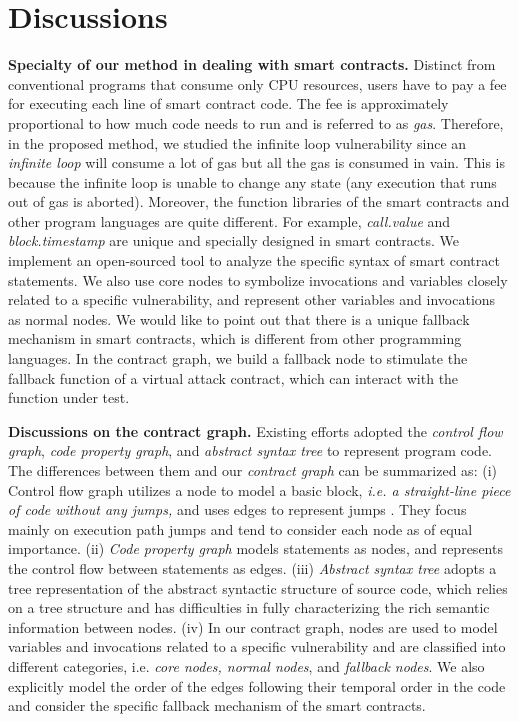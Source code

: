 \vspace{-0.7em}
\section{Discussions}
\textbf{Specialty of our method in dealing with smart contracts.} Distinct from conventional programs that consume only CPU resources, users have to pay a fee for executing each line of smart contract code. The fee is approximately proportional to how much code needs to run and is referred to as \emph{gas}. Therefore, in the proposed method, we studied the infinite loop vulnerability since an \emph{infinite loop} will consume a lot of gas but all the gas is consumed in vain. This is because the infinite loop is unable to change any state (any execution that runs out of gas is aborted).  Moreover, the function libraries of the smart contracts and other program languages are quite different. For example, \emph{call.value} and \emph{block.timestamp} are unique and specially designed in smart contracts. We implement an open-sourced tool to analyze the specific syntax of smart contract statements. We also use core nodes to symbolize  invocations and variables closely related to a specific vulnerability, and represent other variables and invocations as normal nodes. We would like to point out that there is a unique fallback mechanism in smart contracts, which is different from other programming languages. In the contract graph, we build a fallback node to stimulate the fallback function of a virtual attack contract, which can interact with the function under test.

\textbf{Discussions on the contract graph.} Existing efforts adopted the \emph{control flow graph}, \emph{code property graph}, and \emph{abstract syntax tree} to represent program code. The differences between them and our \emph{contract graph} can be summarized as: (i) Control flow graph utilizes a node to model a basic block, \emph{i.e. a straight-line piece of code without any jumps,} and {uses} edges to represent jumps \cite{phan2017convolutional}. They focus mainly on execution path jumps and tend to consider each node as of equal importance. (ii) \emph{Code property graph} \cite{yamaguchi2014modeling,suneja2020learning} models statements as nodes, and represents the control flow between statements as edges. (iii) \emph{Abstract syntax tree} \cite{mou2016convolutional,zhang2019novel} adopts a tree representation of the abstract syntactic structure of source code, which relies on a tree structure and has difficulties in fully characterizing the rich semantic information between nodes. (iv) In our contract graph, nodes are used to model variables and invocations related to a specific vulnerability and are classified into different categories, i.e. \emph{core nodes, normal nodes}, and \emph{fallback nodes}. We also explicitly model the order of the edges following their temporal order in the code and consider the specific fallback mechanism of the smart contracts.

